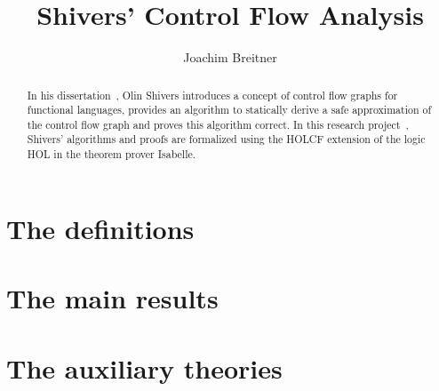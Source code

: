 \documentclass[11pt,a4paper,parskip,abstract]{scrartcl}
\begin{document}
\title{Shivers' Control Flow Analysis}
\author{Joachim Breitner}
\maketitle

\begin{abstract}
  In his dissertation~\cite{Shivers}, Olin Shivers introduces a concept of control flow graphs
  for functional languages, provides an algorithm to statically derive a safe
  approximation of the control flow graph and proves this algorithm correct. In
  this research project~\cite{Studienarbeit}, Shivers' algorithms and proofs are formalized
  using the HOLCF extension of the logic HOL in the theorem prover Isabelle.
\end{abstract}

\tableofcontents

%

\part{The definitions}





\part{The main results}





\part{The auxiliary theories}









\end{document}
